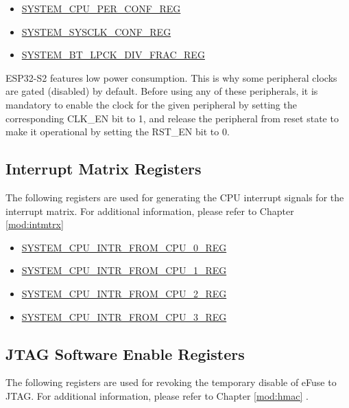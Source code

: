 \documentclass[main\_\_EN.tex]{subfiles}
\begin{document}
\begin{itemize}
    \item \hyperref[regdesc:SYSTEMCPUPERCONFREG]{SYSTEM\_CPU\_PER\_CONF\_REG}
    \item \hyperref[regdesc:SYSTEMSYSCLKCONFREG]{SYSTEM\_SYSCLK\_CONF\_REG}
    \item \hyperref[regdesc:SYSTEMBTLPCKDIVFRACREG]{SYSTEM\_BT\_LPCK\_DIV\_FRAC\_REG}
\end{itemize}

\begin{tiplisting}
ESP32-S2 features low power consumption. This is why some peripheral clocks are gated (disabled) by default. Before using any of these peripherals, it is mandatory to enable the clock for the given peripheral by setting the corresponding CLK\_EN bit to 1, and release the peripheral from reset state to make it operational by setting the RST\_EN bit to 0.
\end{tiplisting}

\subsection{Interrupt Matrix Registers}

The following registers are used for generating the CPU interrupt signals for the interrupt matrix. For additional information, please refer to Chapter
\ref{mod:intmtrx} \textit{}

\begin{itemize}
    \item \hyperref[regdesc:SYSTEMCPUINTRFROMCPU0REG]{SYSTEM\_CPU\_INTR\_FROM\_CPU\_0\_REG}
    \item \hyperref[regdesc:SYSTEMCPUINTRFROMCPU1REG]{SYSTEM\_CPU\_INTR\_FROM\_CPU\_1\_REG}
    \item \hyperref[regdesc:SYSTEMCPUINTRFROMCPU2REG]{SYSTEM\_CPU\_INTR\_FROM\_CPU\_2\_REG}
    \item \hyperref[regdesc:SYSTEMCPUINTRFROMCPU3REG]{SYSTEM\_CPU\_INTR\_FROM\_CPU\_3\_REG}
\end{itemize}

\subsection{JTAG Software Enable Registers}

The following registers are used for revoking the temporary disable of eFuse to JTAG. For additional information, please refer to Chapter \ref{mod:hmac} \textit{}.
\end{document}
